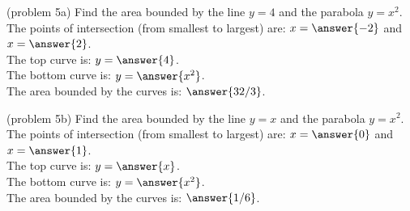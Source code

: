 \documentclass{ximera}
\begin{document}
\begin{problem}(problem 5a)  Find the area bounded by the line $y = 4$ and the parabola $y = x^2$.\\

The points of intersection (from smallest to largest) are: $x = \answer{-2}$ \; and \; $x = \answer{2}$.\\
The top curve is: $y = \answer{4}$.\\
The bottom curve is: $y = \answer{x^2}$.\\
The area bounded by the curves is: $\answer{32/3}$.
\end{problem}



\begin{problem}(problem 5b)  Find the area bounded by the line $y = x$ and the parabola $y = x^2$.\\

The points of intersection (from smallest to largest) are: $x = \answer{0}$ \; and \; $x = \answer{1}$.\\
The top curve is: $y = \answer{x}$.\\
The bottom curve is: $y = \answer{x^2}$.\\
The area bounded by the curves is: $\answer{1/6}$.
\end{problem}
\end{document}
